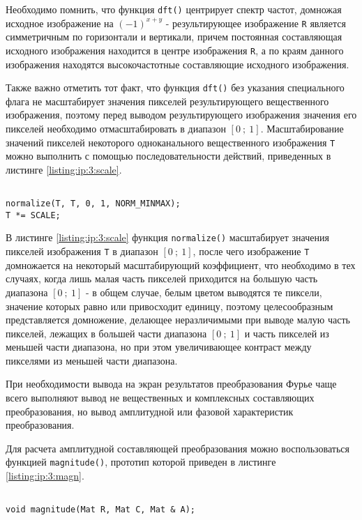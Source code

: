 Необходимо помнить, что функция \verb|dft()| центрирует спектр частот, домножая исходное изображение на $(-1)^{x + y}$ - результирующее изображение \verb|R| является симметричным по горизонтали и вертикали, причем постоянная составляющая исходного изображения находится в центре изображения \verb|R|, а по краям данного изображения находятся высокочастотные составляющие исходного изображения.

Также важно отметить тот факт, что функция \verb|dft()| без указания специального флага не масштабирует значения пикселей результирующего вещественного изображения, поэтому перед выводом результирующего изображения значения его пикселей необходимо отмасштабировать в диапазон $[0 ~;~ 1]$. Масштабирование значений пикселей некоторого одноканального вещественного изображения \verb|T| можно выполнить с помощью последовательности действий, приведенных в листинге \ref{listing:ip:3:scale}.

\begin{lstlisting}

normalize(T, T, 0, 1, NORM_MINMAX);
T *= SCALE;

\end{lstlisting}
\mylistingend

В листинге \ref{listing:ip:3:scale} функция \verb|normalize()| масштабирует значения пикселей изображения \verb|T| в диапазон $[0 ~;~ 1]$, после чего изображение \verb|T| домножается на некоторый масштабирующий коэффициент, что необходимо в тех случаях, когда лишь малая часть пикселей приходится на большую часть диапазона $[0 ~;~ 1]$ - в общем случае, белым цветом выводятся те пиксели, значение которых равно или привосходит единицу, поэтому целесообразным представляется домножение, делающее неразличимыми при выводе малую часть пикселей, лежащих в большей части диапазона $[0 ~;~ 1]$ и часть пикселей из меньшей части диапазона, но при этом увеличивающее контраст между пикселями из меньшей части диапазона.

При необходимости вывода на экран результатов преобразования Фурье чаще всего выполняют вывод не вещественных и комплексных составляющих преобразования, но вывод амплитудной или фазовой характеристик преобразования.

Для расчета амплитудной составляющей преобразования можно воспользоваться функцией \verb|magnitude()|, прототип которой приведен в листинге \ref{listing:ip:3:magn}.

\begin{lstlisting}

void magnitude(Mat R, Mat C, Mat & A);

\end{lstlisting}
\mylistingend

